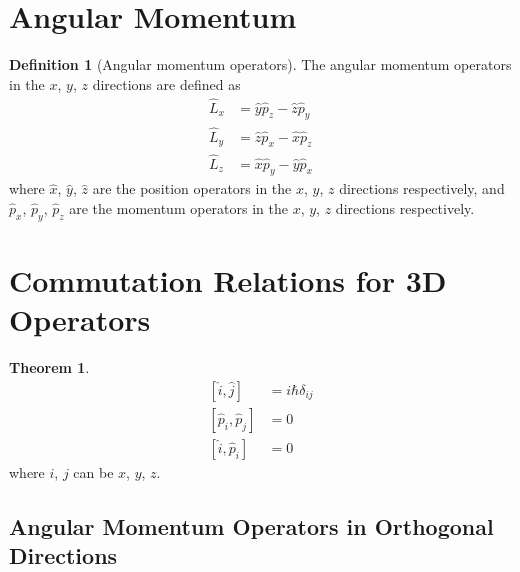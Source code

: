 \documentclass[titlepage, fleqn, a4paper, 12pt, twoside]{article}
\theoremstyle{definition}
\newtheorem{definition}{Definition}
\theoremstyle{theorem}
\newtheorem{theorem}{Theorem}
\let\Oldsection\section
\renewcommand{\section}{\FloatBarrier\Oldsection}
\let\Oldsubsection\subsection
\renewcommand{\subsection}{\FloatBarrier\Oldsubsection}
\begin{document}
\section{Angular Momentum}

\begin{definition}[Angular momentum operators]
	The angular momentum operators in the $x$, $y$, $z$ directions are defined as
	\begin{align*}
		\hat{L}_x &= \hat{y} \hat{p}_z - \hat{z} \hat{p}_y\\
		\hat{L}_y &= \hat{z} \hat{p}_x - \hat{x} \hat{p}_z\\
		\hat{L}_z &= \hat{x} \hat{p}_y - \hat{y} \hat{p}_x
	\end{align*}
	where $\hat{x}$, $\hat{y}$, $\hat{z}$ are the position operators in the $x$, $y$, $z$ directions respectively, and $\hat{p}_x$, $\hat{p}_y$, $\hat{p}_z$ are the momentum operators in the $x$, $y$, $z$ directions respectively.
\end{definition}

\section{Commutation Relations for 3D Operators}

\begin{theorem}
	\begin{align*}
		\left[ \hat{i},\hat{j} \right] &= i \hbar \delta_{i j}\\
		\left[ \hat{p}_i,\hat{p}_j \right] &= 0\\
		\left[ \hat{i},\hat{p}_i \right] &= 0
	\end{align*}
	where $i$, $j$ can be $x$, $y$, $z$.
\end{theorem}

\subsection{Angular Momentum Operators in Orthogonal Directions}
\end{document}
